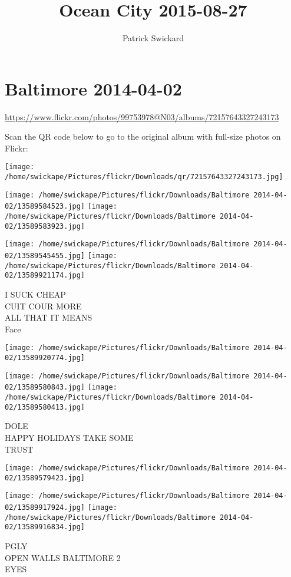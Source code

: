 \documentclass[10pt,letterpaper]{article}
\title{Ocean City 2015-08-27}
\author{Patrick Swickard}
\date{}
\begin{document}
\section*{Baltimore 2014-04-02}

\url{https://www.flickr.com/photos/99753978@N03/albums/72157643327243173}

Scan the QR code below to go to the original album with full-size photos on Flickr:

\texttt{[image: /home/swickape/Pictures/flickr/Downloads/qr/72157643327243173.jpg]}
\pagebreak

\texttt{[image: /home/swickape/Pictures/flickr/Downloads/Baltimore 2014-04-02/13589584523.jpg]}
\texttt{[image: /home/swickape/Pictures/flickr/Downloads/Baltimore 2014-04-02/13589583923.jpg]}

\texttt{[image: /home/swickape/Pictures/flickr/Downloads/Baltimore 2014-04-02/13589545455.jpg]}
\texttt{[image: /home/swickape/Pictures/flickr/Downloads/Baltimore 2014-04-02/13589921174.jpg]}

I SUCK CHEAP\\
CUIT COUR MORE\\
ALL THAT IT MEANS\\
Face
\pagebreak

\texttt{[image: /home/swickape/Pictures/flickr/Downloads/Baltimore 2014-04-02/13589920774.jpg]}

\vspace{0.25in}
\texttt{[image: /home/swickape/Pictures/flickr/Downloads/Baltimore 2014-04-02/13589580843.jpg]}
\texttt{[image: /home/swickape/Pictures/flickr/Downloads/Baltimore 2014-04-02/13589580413.jpg]}

DOLE\\
HAPPY HOLIDAYS TAKE SOME\\
TRUST
\pagebreak

\texttt{[image: /home/swickape/Pictures/flickr/Downloads/Baltimore 2014-04-02/13589579423.jpg]}

\vspace{0.25in}
\texttt{[image: /home/swickape/Pictures/flickr/Downloads/Baltimore 2014-04-02/13589917924.jpg]}
\texttt{[image: /home/swickape/Pictures/flickr/Downloads/Baltimore 2014-04-02/13589916834.jpg]}

PGLY\\
OPEN WALLS BALTIMORE 2\\
EYES
\pagebreak
\end{document}
